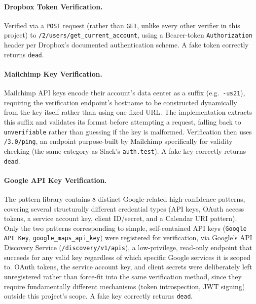 \documentclass[12pt]{article}
\begin{document}
\paragraph{Dropbox Token Verification.}
Verified via a \texttt{POST} request (rather than \texttt{GET}, unlike every other verifier in this project) to \texttt{/2/users/get\_current\_account}, using a Bearer-token \texttt{Authorization} header per Dropbox's documented authentication scheme. A fake token correctly returns \texttt{dead}.

\paragraph{Mailchimp Key Verification.}
Mailchimp API keys encode their account's data center as a suffix (e.g.\ \texttt{-us21}), requiring the verification endpoint's hostname to be constructed dynamically from the key itself rather than using one fixed URL. The implementation extracts this suffix and validates its format before attempting a request, falling back to \texttt{unverifiable} rather than guessing if the key is malformed. Verification then uses \texttt{/3.0/ping}, an endpoint purpose-built by Mailchimp specifically for validity checking (the same category as Slack's \texttt{auth.test}). A fake key correctly returns \texttt{dead}.

\paragraph{Google API Key Verification.}
The pattern library contains 8 distinct Google-related high-confidence patterns, covering several structurally different credential types (API keys, OAuth access tokens, a service account key, client ID/secret, and a Calendar URI pattern). Only the two patterns corresponding to simple, self-contained API keys (\texttt{Google API Key}, \texttt{google\_maps\_api\_key}) were registered for verification, via Google's API Discovery Service (\texttt{/discovery/v1/apis}), a low-privilege, read-only endpoint that succeeds for any valid key regardless of which specific Google services it is scoped to. OAuth tokens, the service account key, and client secrets were deliberately left unregistered rather than force-fit into the same verification method, since they require fundamentally different mechanisms (token introspection, JWT signing) outside this project's scope. A fake key correctly returns \texttt{dead}.
\end{document}

